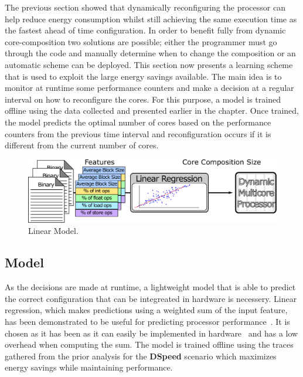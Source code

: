 The previous section showed that dynamically reconfiguring the processor can help reduce energy consumption whilst still achieving the same execution time as the fastest ahead of time configuration.
In order to benefit fully from dynamic core-composition two solutions are possible; either the programmer must go through the code and manually determine when to change the composition or an automatic scheme can be deployed.
This section now presents a learning scheme that is used to exploit the large energy savings available.
The main idea is to monitor at runtime some performance counters and make a decision at a regular interval on how to reconfigure the cores.
For this purpose, a model is trained offline using the data collected and presented earlier in the chapter.
Once trained, the model predicts the optimal number of cores based on the performance counters from the previous time interval and reconfiguration occurs if it is different from the current number of cores.

\begin{figure}[t]
    \centering
	\includegraphics[width=1\textwidth]{cases-paper/graphics/other/model3.pdf}
    \caption{Linear Model.}
    \label{fig:linmod}
	\vspace{1em}
\end{figure}
\subsection{Model}

As the decisions are made at runtime, a lightweight model that is able to predict the correct configuration that can be integreated in hardware is necessery.
Linear regression, which makes predictions using a weighted sum of the input feature, has been demonstrated to be useful for predicting processor performance~\cite{Joseph2006LinReg}.
It is chosen as it has been as it can easily be implemented in hardware~\cite{lee2006linreg,Lukefahr2012Composite} and has a low overhead when computing the sum.
The model is trained offline using the traces gathered from the prior analysis for the \textbf{DSpeed} scenario which maximizes energy savings while maintaining performance.

